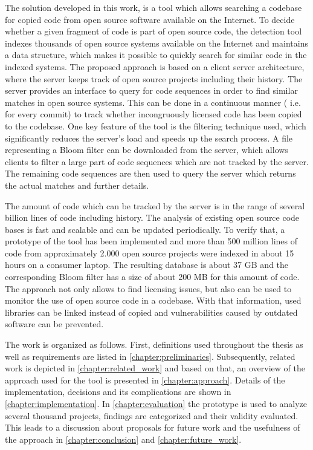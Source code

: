 The solution developed in this work, is a tool which allows searching a codebase for copied code from open source software available on the Internet.
To decide whether a given fragment of code is part of open source code, the detection tool indexes thousands of open source systems available on the Internet and maintains a data structure, which makes it possible to quickly search for similar code in the indexed systems.
The proposed approach is based on a client server architecture, where the server keeps track of open source projects including their history.
The server provides an interface to query for code sequences in order to find similar matches in open source systems.
This can be done in a continuous manner ( i.e. for every commit) to track whether incongruously licensed code has been copied to the codebase.
One key feature of the tool is the filtering technique used, which significantly reduces the server's load and speeds up the search process.
A file representing a Bloom filter can be downloaded from the server, which allows clients to filter a large part of code sequences which are not tracked by the server.
The remaining code sequences are then used to query the server which returns the actual matches and further details.

The amount of code which can be tracked by the server is in the range of several billion lines of code including history.
The analysis of existing open source code bases is fast and scalable and can be updated periodically.
To verify that, a prototype of the tool has been implemented and more than 500 million lines of code from approximately 2.000 open source projects were indexed in about 15 hours on a consumer laptop.
The resulting database is about 37 GB and the corresponding Bloom filter has a size of about 200 MB for this amount of code.
The approach not only allows to find licensing issues, but also can be used to monitor the use of open source code in a codebase.
With that information, used libraries can be linked instead of copied and vulnerabilities caused by outdated software can be prevented.

The work is organized as follows.
First, definitions used throughout the thesis as well as requirements are listed in \autoref{chapter:preliminaries}.
Subsequently, related work is depicted in \autoref{chapter:related_work} and based on that, an overview of the approach used for the tool is presented in \autoref{chapter:approach}.
Details of the implementation, decisions and its complications are shown in \autoref{chapter:implementation}.
In \autoref{chapter:evaluation} the prototype is used to analyze several thousand projects, findings are categorized and their validity evaluated.
This leads to a discussion about proposals for future work and the usefulness of the approach in \autoref{chapter:conclusion} and \autoref{chapter:future_work}.